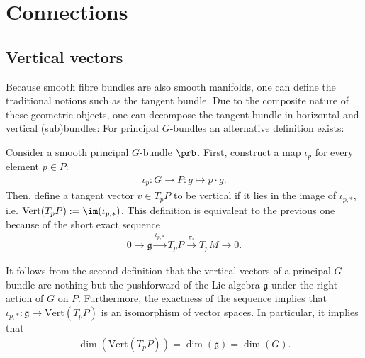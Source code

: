 \section{Connections}\label{section:connections}
\subsection{Vertical vectors}

    Because smooth fibre bundles are also smooth manifolds, one can define the traditional notions such as the tangent bundle. Due to the composite nature of these geometric objects, one can decompose the tangent bundle in horizontal and vertical (sub)bundles:
    For principal $G$-bundles an alternative definition exists:
    \begin{adefinition}
        Consider a smooth principal $G$-bundle $\prb$. First, construct a map $\iota_p$ for every element $p\in P$:
        \begin{gather}
            \iota_p:G\rightarrow P:g\mapsto p\cdot g.
        \end{gather}
        Then, define a tangent vector $v\in T_p P$ to be vertical if it lies in the image of $\iota_{p,\ast}$, i.e. $\mathrm{Vert}(T_pP) := \im(\iota_{p,\ast})$. This definition is equivalent to the previous one because of the short exact sequence
        \begin{gather}
            0\longrightarrow\mathfrak{g}\overset{\iota_{p,\ast}}{\longrightarrow}T_pP\overset{\pi_\ast}{\longrightarrow}T_pM\longrightarrow0.
        \end{gather}
    \end{adefinition}

    \begin{property}\label{bundle:vertical_dimension}
        It follows from the second definition that the vertical vectors of a principal $G$-bundle are nothing but the pushforward of the Lie algebra $\mathfrak{g}$ under the right action of $G$ on $P$. Furthermore, the exactness of the sequence implies that $\iota_{p,\ast}:\mathfrak{g}\rightarrow\mathrm{Vert}(T_pP)$ is an isomorphism of vector spaces. In particular, it implies that
        \begin{gather}
            \dim(\mathrm{Vert}(T_pP)) = \dim(\mathfrak{g}) = \dim(G).
        \end{gather}
    \end{property}

